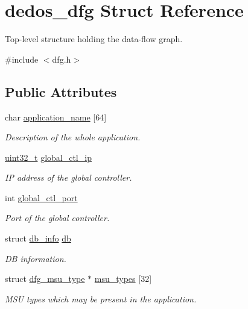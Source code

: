 \hypertarget{structdedos__dfg}{\section{dedos\-\_\-dfg Struct Reference}
\label{structdedos__dfg}
}


Top-\/level structure holding the data-\/flow graph.  




{\ttfamily \#include $<$dfg.\-h$>$}

\subsection*{Public Attributes}
\begin{DoxyCompactItemize}
\item 
char \hyperlink{structdedos__dfg_a0eceb9cb1a7d21b3ed8f9be508522780}{application\-\_\-name} \mbox{[}64\mbox{]}
\begin{DoxyCompactList}\small\item\em Description of the whole application. \end{DoxyCompactList}\item 
\hyperlink{msus_2webserver_2uthash_8h_a435d1572bf3f880d55459d9805097f62}{uint32\-\_\-t} \hyperlink{structdedos__dfg_acab1dc92b08936f48e02d5f1eb1a4f51}{global\-\_\-ctl\-\_\-ip}
\begin{DoxyCompactList}\small\item\em I\-P address of the global controller. \end{DoxyCompactList}\item 
int \hyperlink{structdedos__dfg_ab0e37e7cbde75494f9f9dc509ff06faa}{global\-\_\-ctl\-\_\-port}
\begin{DoxyCompactList}\small\item\em Port of the global controller. \end{DoxyCompactList}\item 
struct \hyperlink{structdb__info}{db\-\_\-info} \hyperlink{structdedos__dfg_ad8621d636821cbbe634b07738898a17e}{db}
\begin{DoxyCompactList}\small\item\em D\-B information. \end{DoxyCompactList}\item 
struct \hyperlink{structdfg__msu__type}{dfg\-\_\-msu\-\_\-type} $\ast$ \hyperlink{structdedos__dfg_a6413c359339136a9acaf77df3b897305}{msu\-\_\-types} \mbox{[}32\mbox{]}
\begin{DoxyCompactList}\small\item\em M\-S\-U types which may be present in the application. \end{DoxyCompactList}\item 

\end{DoxyCompactItemize}
